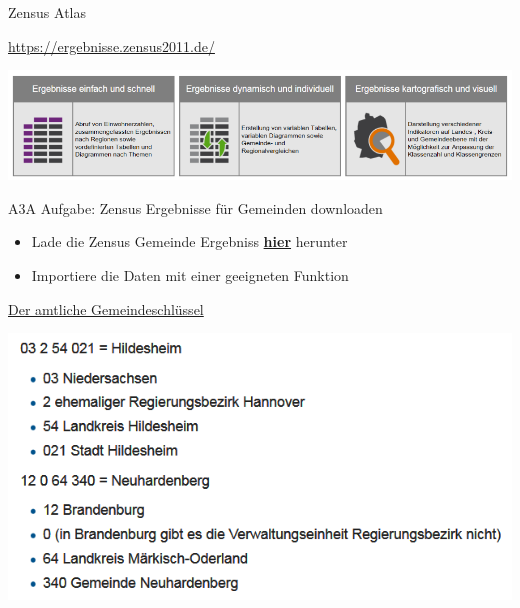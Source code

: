 \documentclass[ignorenonframetext,]{beamer}
\providecommand{\tightlist}{%
  \setlength{\itemsep}{0pt}\setlength{\parskip}{0pt}}
\begin{document}
\begin{frame}{Zensus Atlas}
\protect\hypertarget{zensus-atlas}{}

\begin{block}{\url{https://ergebnisse.zensus2011.de/}}

\includegraphics{figure/Zensusdtb.PNG}

\end{block}

\end{frame}

\begin{frame}{A3A Aufgabe: Zensus Ergebnisse für Gemeinden downloaden}
\protect\hypertarget{a3a-aufgabe-zensus-ergebnisse-fur-gemeinden-downloaden}{}

\begin{itemize}
\tightlist
\item
  Lade die Zensus Gemeinde Ergebniss
  \href{https://www.zensus2011.de/SharedDocs/Aktuelles/Ergebnisse/DemografischeGrunddaten.html}{\textbf{hier}}
  herunter
\item
  Importiere die Daten mit einer geeigneten Funktion
\end{itemize}

\end{frame}

\begin{frame}{\href{https://de.wikipedia.org/wiki/Amtlicher_Gemeindeschl\%C3\%BCssel}{Der
amtliche Gemeindeschlüssel}}
\protect\hypertarget{der-amtliche-gemeindeschlussel}{}

\includegraphics{figure/ags_beispiele.PNG}

\end{frame}
\end{document}
